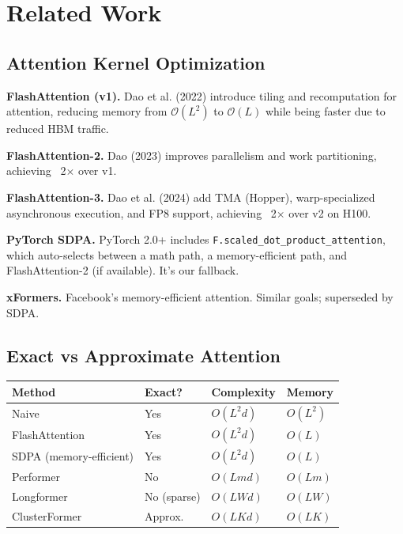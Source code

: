 \section{Related Work}

\subsection{Attention Kernel Optimization}

\textbf{FlashAttention (v1).} Dao et al. (2022) introduce tiling and 
recomputation for attention, reducing memory from $\mathcal{O}(L^2)$ to 
$\mathcal{O}(L)$ while being faster due to reduced HBM traffic.

\textbf{FlashAttention-2.} Dao (2023) improves parallelism and work partitioning, 
achieving ~2$\times$ over v1.

\textbf{FlashAttention-3.} Dao et al. (2024) add TMA (Hopper), warp-specialized 
asynchronous execution, and FP8 support, achieving ~2$\times$ over v2 on H100.

\textbf{PyTorch SDPA.} PyTorch 2.0+ includes \texttt{F.scaled\_dot\_product\_attention}, 
which auto-selects between a math path, a memory-efficient path, and 
FlashAttention-2 (if available). It's our fallback.

\textbf{xFormers.} Facebook's memory-efficient attention. Similar goals; 
superseded by SDPA.

\subsection{Exact vs Approximate Attention}

\begin{table}[H]
\centering
\small
\begin{tabular}{llll}
\toprule
\textbf{Method} & \textbf{Exact?} & \textbf{Complexity} & \textbf{Memory} \\
\midrule
Naive & Yes & $O(L^2 d)$ & $O(L^2)$ \\
FlashAttention & Yes & $O(L^2 d)$ & $O(L)$ \\
SDPA (memory-efficient) & Yes & $O(L^2 d)$ & $O(L)$ \\
Performer & No & $O(L m d)$ & $O(L m)$ \\
Longformer & No (sparse) & $O(L W d)$ & $O(L W)$ \\
ClusterFormer & Approx. & $O(L K d)$ & $O(L K)$ \\
\bottomrule
\end{tabular}
\end{table}

